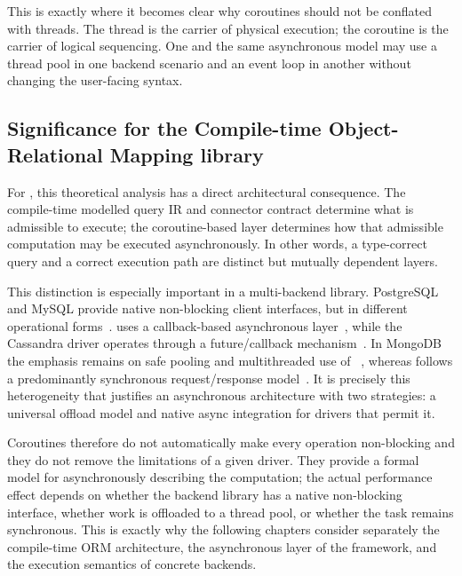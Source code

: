 This is exactly where it becomes clear why coroutines should not be conflated with threads. The thread is the carrier of physical execution; the coroutine is the carrier of logical sequencing. One and the same asynchronous model may use a thread pool in one backend scenario and an event loop in another without changing the user-facing  syntax.

\subsection{Significance for the Compile-time Object-Relational Mapping library}

For \ORMName{}, this theoretical analysis has a direct architectural consequence. The compile-time modelled query IR and connector contract determine what is admissible to execute; the coroutine-based layer determines how that admissible computation may be executed asynchronously. In other words, a type-correct query and a correct execution path are distinct but mutually dependent layers.

This distinction is especially important in a multi-backend library. PostgreSQL and MySQL provide native non-blocking client interfaces, but in different operational forms~\cite{libpq_async,mysql_capi_async}.  uses a callback-based asynchronous layer~\cite{hiredis}, while the Cassandra driver operates through a future/callback mechanism~\cite{cassandra_futures}. In MongoDB the emphasis remains on safe pooling and multithreaded use of ~\cite{mongoc_client_pool}, whereas  follows a predominantly synchronous request/response model~\cite{libneo4j_client}. It is precisely this heterogeneity that justifies an asynchronous architecture with two strategies: a universal offload model and native async integration for drivers that permit it.

Coroutines therefore do not automatically make every operation non-blocking and they do not remove the limitations of a given driver. They provide a formal model for asynchronously describing the computation; the actual performance effect depends on whether the backend library has a native non-blocking interface, whether work is offloaded to a thread pool, or whether the task remains synchronous. This is exactly why the following chapters consider separately the compile-time ORM architecture, the asynchronous layer of the framework, and the execution semantics of concrete backends.
